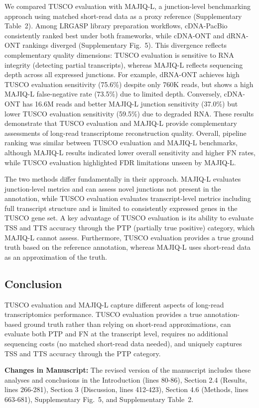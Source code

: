 \documentclass[11pt]{article}
\begin{document}
\begin{responseboxnew}
We compared TUSCO evaluation with MAJIQ-L, a junction-level benchmarking approach using matched short-read data as a proxy reference (Supplementary Table~2). Among LRGASP library preparation workflows, cDNA-PacBio consistently ranked best under both frameworks, while cDNA-ONT and dRNA-ONT rankings diverged (Supplementary Fig.~5). This divergence reflects complementary quality dimensions: TUSCO evaluation is sensitive to RNA integrity (detecting partial transcripts), whereas MAJIQ-L reflects sequencing depth across all expressed junctions. For example, dRNA-ONT achieves high TUSCO evaluation sensitivity (75.6\%) despite only 760K reads, but shows a high MAJIQ-L false-negative rate (73.5\%) due to limited depth. Conversely, cDNA-ONT has 16.6M reads and better MAJIQ-L junction sensitivity (37.0\%) but lower TUSCO evaluation sensitivity (59.5\%) due to degraded RNA. These results demonstrate that TUSCO evaluation and MAJIQ-L provide complementary assessments of long-read transcriptome reconstruction quality. Overall, pipeline ranking was similar between TUSCO evaluation and MAJIQ-L benchmarks, although MAJIQ-L results indicated lower overall sensitivity and higher FN rates, while TUSCO evaluation highlighted FDR limitations unseen by MAJIQ-L.

The two methods differ fundamentally in their approach. MAJIQ-L evaluates junction-level metrics and can assess novel junctions not present in the annotation, while TUSCO evaluation evaluates transcript-level metrics including full transcript structure and is limited to consistently expressed genes in the TUSCO gene set. A key advantage of TUSCO evaluation is its ability to evaluate TSS and TTS accuracy through the PTP (partially true positive) category, which MAJIQ-L cannot assess. Furthermore, TUSCO evaluation provides a true ground truth based on the reference annotation, whereas MAJIQ-L uses short-read data as an approximation of the truth.

\subsection*{Conclusion}

TUSCO evaluation and MAJIQ-L capture different aspects of long-read transcriptomics performance. TUSCO evaluation provides a true annotation-based ground truth rather than relying on short-read approximations, can evaluate both PTP and FN at the transcript level, requires no additional sequencing costs (no matched short-read data needed), and uniquely captures TSS and TTS accuracy through the PTP category.

\textbf{Changes in Manuscript:} The revised version of the manuscript includes these analyses and conclusions in the Introduction (lines 80-86), Section 2.4 (Results, lines 266-281), Section 3 (Discussion, lines 412-423), Section 4.6 (Methods, lines 663-681), Supplementary Fig.~5, and Supplementary Table~2.

\end{responseboxnew}
\end{document}
